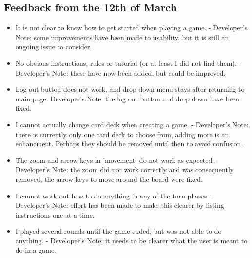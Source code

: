 \subsection{Feedback from the 12th of March}
\begin{itemize}
	\item It is not clear to know how to get started when playing a game. - Developer's Note: some improvements have been made to usability, but it is still an ongoing issue to consider.
	\item No obvious instructions, rules or tutorial (or at least I did not find them). - Developer's Note:  these have now been added, but could be improved.
	\item Log out button does not work, and drop down menu stays after returning to main page. Developer's Note: the log out button and drop down have been fixed.
	\item I cannot actually change card deck when creating a game. - Developer's Note: there is currently only one card deck to choose from, adding more is an enhancment. Perhaps they should be removed until then to avoid confusion.
	\item The zoom and arrow keys in 'movement' do not work as expected. - Developer's Note: the zoom did not work correctly and was consequently removed, the arrow keys to move around the board were fixed.
	\item I cannot work out how to do anything in any of the turn phases. - Developer's Note: effort has been made to make this clearer by listing instructions one at a time.
	\item I played several rounds until the game ended, but was not able to do anything. - Developer's Note: it needs to be clearer what the user is meant to do in a game.
\end{itemize}

